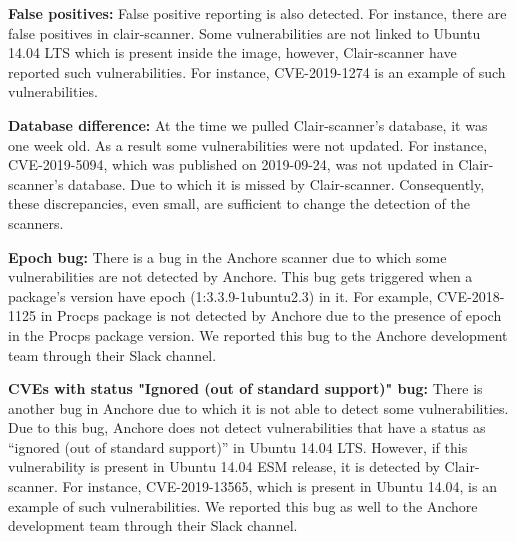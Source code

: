 \documentclass[a4paper,num-refs]{oup-contemporary}
\begin{document}
\textbf{False positives:} False positive reporting is also detected. For instance,
there are false positives in clair-scanner.
Some vulnerabilities are not linked to Ubuntu 14.04 LTS which is 
present inside the image, however, Clair-scanner have reported such vulnerabilities.
For instance, CVE-2019-1274 is an example of such vulnerabilities. 

\textbf{Database difference:} At the time we pulled Clair-scanner's database, it was one week old.
                              As a result some vulnerabilities were not updated. For instance, CVE-2019-5094, which
		              was published on 2019-09-24, was not 
		              updated in Clair-scanner's database. Due to which it is missed by Clair-scanner.
			      Consequently, these discrepancies, even small, are sufficient to change the detection of
			      the scanners.

\textbf{Epoch bug:} There is a bug in the Anchore scanner due to which some vulnerabilities are 
		not detected by Anchore. This bug gets triggered when a package’s version have epoch 
		(1:3.3.9-1ubuntu2.3) in it. For example, CVE-2018-1125 in Procps package is not
		detected by Anchore due to the presence of epoch in the Procps package version.
		We reported this bug to the Anchore development team through their Slack channel.

\textbf{CVEs with status "Ignored (out of standard support)" bug:} There is another bug in Anchore due to 
		which it is not able to detect some vulnerabilities. Due to this bug, Anchore does not detect 
		vulnerabilities that have a status as “ignored (out of standard support)” in Ubuntu 14.04 LTS. 
		However, if this vulnerability is present in Ubuntu 14.04 ESM release, it is detected by Clair-scanner. 
		For instance, CVE-2019-13565, which is present in Ubuntu 14.04, is an example of such vulnerabilities. 
		We reported this bug as well to the Anchore development team through their Slack
		channel.
\end{document}
